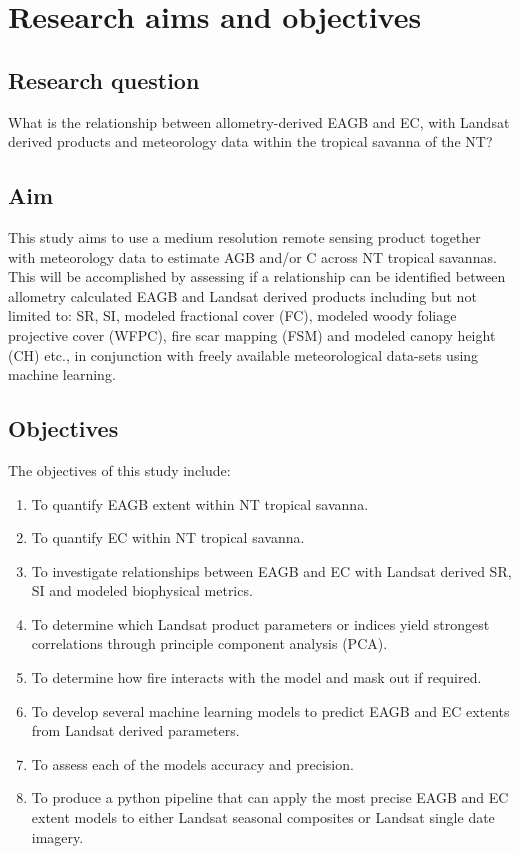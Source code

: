 \newpage
\section{Research aims and objectives}

\subsection{Research question}
What is the relationship between allometry-derived EAGB and EC, with Landsat derived products and meteorology data within the tropical savanna of the NT?
\subsection{Aim}
This study aims to use a medium resolution remote sensing product together with meteorology data to estimate AGB and/or C across NT tropical savannas. This will be accomplished by assessing if a relationship can be identified between allometry calculated EAGB and Landsat derived products including but not limited to: SR, SI, modeled fractional cover (FC), modeled woody foliage projective cover (WFPC), fire scar mapping (FSM) and modeled canopy height (CH) etc., in conjunction with freely available meteorological data-sets using machine learning.

\subsection{Objectives}
The objectives of this study include:

\begin{enumerate}
    \item To quantify EAGB extent within NT tropical savanna.
    \item To quantify EC within NT tropical savanna.
    \item To investigate relationships between EAGB and EC with Landsat derived SR, SI and modeled biophysical metrics.
    \item To determine which Landsat product parameters or indices yield strongest correlations through principle component analysis (PCA).
    \item To determine how fire interacts with the model and mask out if required.
    \item To develop several machine learning models to predict EAGB and EC extents from Landsat derived parameters.
    \item To assess each of the models accuracy and precision.
    \item To produce a python pipeline that can apply the most precise EAGB and EC extent models to either Landsat seasonal composites or Landsat single date imagery.

\end{enumerate}